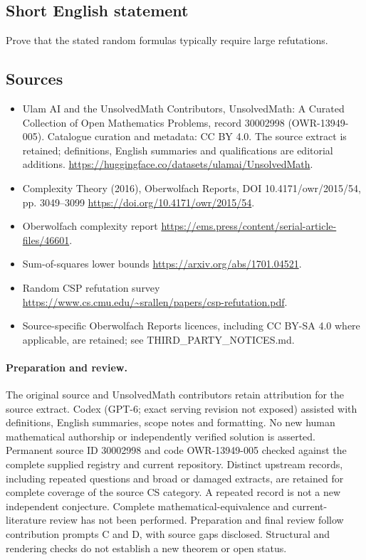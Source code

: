 \documentclass[11pt]{article}
\begin{document}
\subsection{Short English statement}
Prove that the stated random formulas typically require large refutations.
\subsection{Sources}
\begin{itemize}
\item[\hypertarget{source:30002998:1}{S1}] Ulam AI and the UnsolvedMath Contributors, UnsolvedMath: A Curated Collection of Open Mathematics Problems, record 30002998 (OWR-13949-005). Catalogue curation and metadata: CC BY 4.0. The source extract is retained; definitions, English summaries and qualifications are editorial additions.
\url{https://huggingface.co/datasets/ulamai/UnsolvedMath}.
\item[\hypertarget{source:30002998:2}{S2}] Complexity Theory (2016), Oberwolfach Reports, DOI 10.4171/owr/2015/54, pp. 3049--3099
\url{https://doi.org/10.4171/owr/2015/54}.
\item[\hypertarget{source:30002998:3}{S3}] Oberwolfach complexity report
\url{https://ems.press/content/serial-article-files/46601}.
\item[\hypertarget{source:30002998:4}{S4}] Sum-of-squares lower bounds
\url{https://arxiv.org/abs/1701.04521}.
\item[\hypertarget{source:30002998:5}{S5}] Random CSP refutation survey
\url{https://www.cs.cmu.edu/~srallen/papers/csp-refutation.pdf}.
\item Source-specific Oberwolfach Reports licences, including CC BY-SA 4.0 where applicable, are retained; see THIRD\_PARTY\_NOTICES.md.
\end{itemize}
\paragraph{Preparation and review.}
The original source and UnsolvedMath contributors retain attribution for the source extract. Codex (GPT-6; exact serving revision not exposed) assisted with definitions, English summaries, scope notes and formatting. No new human mathematical authorship or independently verified solution is asserted. Permanent source ID 30002998 and code OWR-13949-005 checked against the complete supplied registry and current repository. Distinct upstream records, including repeated questions and broad or damaged extracts, are retained for complete coverage of the source CS category. A repeated record is not a new independent conjecture. Complete mathematical-equivalence and current-literature review has not been performed. Preparation and final review follow contribution prompts C and D, with source gaps disclosed. Structural and rendering checks do not establish a new theorem or open status.
\label{end:30002998}
\end{document}

